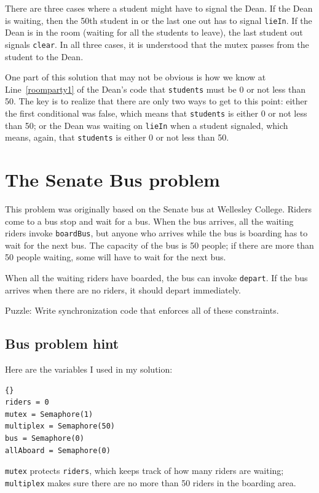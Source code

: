 \documentclass{book}
\begin{document}
There are three cases where a student might have to signal the Dean.
If the Dean is waiting, then the 50th student in or the last one out
has to signal {\tt lieIn}.  If the Dean is in the room (waiting for
all the students to leave), the last student out signals {\tt clear}.
In all three cases, it is understood that the mutex passes from the
student to the Dean.

One part of this solution that may not be obvious is how we know at
Line~\ref{roomparty1} of the Dean's code that {\tt students} must be 0
or not less than 50.  The key is to realize that there are only two
ways to get to this point: either the first conditional was false,
which means that {\tt students} is either 0 or not less than 50; or
the Dean was waiting on {\tt lieIn} when a student signaled, which
means, again, that {\tt students} is either 0 or not less than 50.



\section{The Senate Bus problem}

This problem was originally based on the Senate bus at Wellesley
College.  Riders come to a bus stop and wait for a bus.  When the bus
arrives, all the waiting riders invoke {\tt boardBus}, but anyone who
arrives while the bus is boarding has to wait for the next bus.  The
capacity of the bus is 50 people; if there are more than 50 people
waiting, some will have to wait for the next bus.

When all the waiting riders have boarded,
the bus can invoke {\tt depart}.  If the bus arrives when there
are no riders, it should depart immediately.

Puzzle: Write synchronization code that enforces all of these
constraints.



\subsection {Bus problem hint}

Here are the variables I used in my solution:

\begin{lstlisting}[title={Bus problem hint}]{}
riders = 0
mutex = Semaphore(1)
multiplex = Semaphore(50)
bus = Semaphore(0)
allAboard = Semaphore(0)
\end{lstlisting}

{\tt mutex} protects {\tt riders}, which keeps track of
how many riders are waiting;
{\tt multiplex} makes sure there are no more than 50 riders
in the boarding area.
\end{document}
